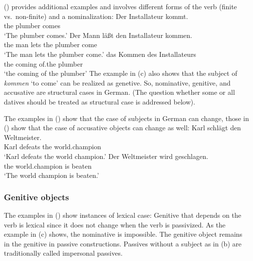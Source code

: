 () provides additional examples and involves different forms of the verb (finite
vs.\ non-finite) and a nominalization:
\eal
\ex 
\gll Der Installateur kommt.\\
     the plumber      comes\\
\glt `The plumber comes.'
\ex 
\gll Der Mann läßt den Installateur kommen.\\
     the man  lets the plumber      come\\
\glt `The man lets the plumber come.'
\ex 
\gll das Kommen des Installateurs\\
     the coming of.the plumber\\
\glt `the coming of the plumber'
\zl
The example in (c) also shows that the subject of \emph{kommen} `to come' can be realized as
genetive. So, nominative, genitive, and accusative are structural cases in German. (The question
whether some or all datives should be treated as structural case is addressed below).

The examples in () show that the case of subjects in German can change, those in ()
show that the case of accusative objects can change as well:
\eal
\ex 
\gll Karl schlägt den Weltmeister.\\
     Karl defeats the world.champion\\
\glt `Karl defeats the world champion.'
\ex 
\gll Der Weltmeister wird geschlagen.\\
     the world.champion is beaten\\
\glt `The world champion is beaten.'
\zl

\subsubsection{Genitive objects}

The examples in () show instances of lexical case: Genitive that depends on the verb is
lexical since it does not change when the verb is passivized.
\eal
{}
\zl
As the example in (c) shows, the nominative is impossible. The genitive object remains in the
genitive in passive constructions. Passives without a subject as in (b) are traditionally
called impersonal passives.

